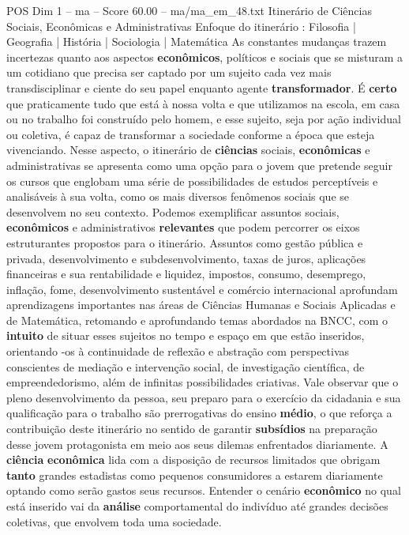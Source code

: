 \begin{textsample}{POS Dim 1 – ma – Score 60.00 – ma/ma\_em\_48.txt}  \label{ex:f1_pos_064}
Itinerário de Ciências Sociais, Econômicas e Administrativas Enfoque do itinerário : Filosofia | Geografia | História | Sociologia | Matemática As constantes mudanças trazem incertezas quanto aos aspectos \textbf{econômicos}, políticos e sociais que se misturam a um cotidiano que precisa ser captado por um sujeito cada vez mais transdisciplinar e ciente do seu papel enquanto agente \textbf{transformador}.
É \textbf{certo} que praticamente tudo que está à nossa volta e que utilizamos na escola, em casa ou no trabalho foi construído pelo homem, e esse sujeito, seja por ação individual ou coletiva, é capaz de transformar a sociedade conforme a época que esteja vivenciando.
Nesse aspecto, o itinerário de \textbf{ciências} sociais, \textbf{econômicas} e administrativas se apresenta como uma opção para o jovem que pretende seguir os cursos que englobam uma série de possibilidades de estudos perceptíveis e analisáveis à sua volta, como os mais diversos fenômenos sociais que se desenvolvem no seu contexto.
Podemos exemplificar assuntos sociais, \textbf{econômicos} e administrativos \textbf{relevantes} que podem percorrer os eixos estruturantes propostos para o itinerário.
Assuntos como gestão pública e privada, desenvolvimento e subdesenvolvimento, taxas de juros, aplicações financeiras e sua rentabilidade e liquidez, impostos, consumo, desemprego, inflação, fome, desenvolvimento sustentável e comércio internacional aprofundam aprendizagens importantes nas áreas de Ciências Humanas e Sociais Aplicadas e de Matemática, retomando e aprofundando temas abordados na BNCC, com o \textbf{intuito} de situar esses sujeitos no tempo e espaço em que estão inseridos, orientando -os à continuidade de reflexão e abstração com perspectivas conscientes de mediação e intervenção social, de investigação científica, de empreendedorismo, além de infinitas possibilidades criativas.
Vale observar que o pleno desenvolvimento da pessoa, seu preparo para o exercício da cidadania e sua qualificação para o trabalho são prerrogativas do ensino \textbf{médio}, o que reforça a contribuição deste itinerário no sentido de garantir \textbf{subsídios} na preparação desse jovem protagonista em meio aos seus dilemas enfrentados diariamente.
A \textbf{ciência} \textbf{econômica} lida com a disposição de recursos limitados que obrigam \textbf{tanto} grandes estadistas como pequenos consumidores a estarem diariamente optando como serão gastos seus recursos.
Entender o cenário \textbf{econômico} no qual está inserido vai da \textbf{análise} comportamental do indivíduo até grandes decisões coletivas, que envolvem toda uma sociedade.

\end{textsample}
